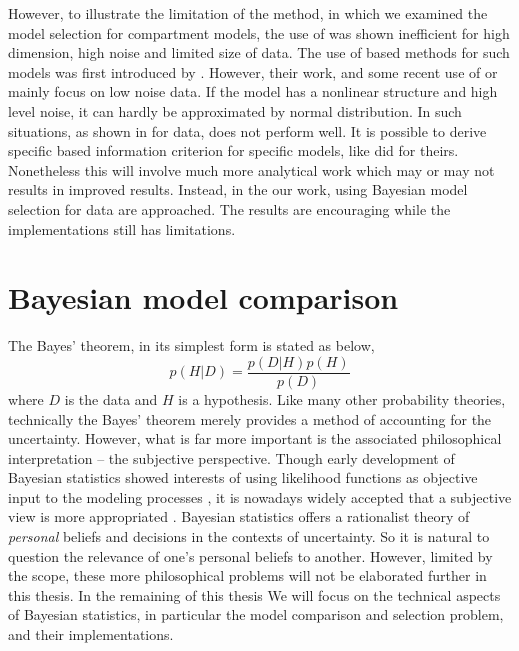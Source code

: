 \documentclass[11pt, hyper, bib, fontset=Minion]{marticle}
\begin{document}
However, to illustrate the limitation of the \aicc method, in
\textcite{Zhou:2011uo} which we examined the model selection for compartment
models, the use of \aicc was shown inefficient for high dimension, high noise
and limited size of data. The use of \aic based methods for such models was
first introduced by \textcite{Hawkins:1986ha}. However, their work, and some
recent use of \aic or \aicc mainly focus on low noise data. If the model has a
nonlinear structure and high level noise, it can hardly be approximated by
normal distribution. In such situations, as shown in \textcite{Zhou:2011uo}
for \pet data, \aicc does not perform well. It is possible to derive specific
\aic based information criterion for specific models, like
\textcite{Hurvich:1989ev} did for theirs. Nonetheless this will involve much
more analytical work which may or may not results in improved results.
Instead, in the our work, using Bayesian model selection for \pet data are
approached. The results are encouraging while the implementations still has
limitations.

\section{Bayesian model comparison}
\label{sec:Bayesian model comparison}

The Bayes' theorem, in its simplest form is stated as below,
\begin{equation}
  p(H|D) = \frac{p(D|H)p(H)}{p(D)} \label{eq:bayes}
\end{equation}
where $D$ is the data and $H$ is a hypothesis. Like many other probability
theories, technically the Bayes' theorem merely provides a method of
accounting for the uncertainty. However, what is far more important is the
associated philosophical interpretation -- the subjective perspective. Though
early development of Bayesian statistics showed interests of using likelihood
functions as objective input to the modeling processes
\parencite{Jeffreys:1961ua, Jeffreys:1946jf}, it is nowadays widely accepted
that a subjective view is more appropriated
\parencite[see][chap.~1]{Bernardo:1994vd}. Bayesian statistics offers a
rationalist theory of \emph{personal} beliefs and decisions in the contexts of
uncertainty. So it is natural to question the relevance of one's personal
beliefs to another. However, limited by the scope, these more philosophical
problems will not be elaborated further in this thesis. In the remaining of
this thesis We will focus on the technical aspects of Bayesian statistics, in
particular the model comparison and selection problem, and their
implementations.
\end{document}

